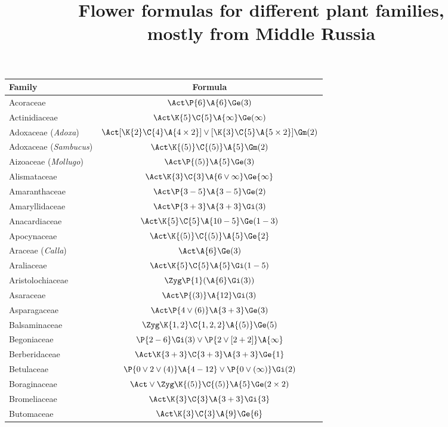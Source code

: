 ﻿\documentclass[12pt]{article}
\title{Flower formulas for different plant families,\\ mostly from Middle Russia}
\author{}
\date{}
\begin{document}
\maketitle

\begin{longtable}{lc}
\hline\rowcolor{tableheadcolor}\textbf{Family}&\textbf{Formula}\\[2pt]
\endhead
\hline
\endfoot
Acoraceae & $\Act\P{6}\A{6}\Ge(3)$\\[2pt]
Actinidiaceae & $\Act\K{5}\C{5}\A{\infty}\Ge(\infty)$\\[2pt]
Adoxaceae (\textit{Adoxa}) & $\Act[\K{2}\C{4}\A{4\times2}]\vee[\K{3}\C{5}\A{5\times2}]\Gm(2)$\\[2pt]
Adoxaceae (\textit{Sambucus}) & $\Act\K{(5)}\C{(5)}\A{5}\Gm(2)$\\[2pt]
Aizoaceae (\textit{Mollugo}) & $\Act\P{(5)}\A{5}\Ge(3)$\\[2pt]
Alismataceae & $\Act\K{3}\C{3}\A{6\vee\infty}\Ge{\infty}$\\[2pt]
Amaranthaceae & $\Act\P{3-5}\A{3-5}\Ge(2)$\\[2pt]
Amaryllidaceae & $\Act\P{3+3}\A{3+3}\Gi(3)$\\[2pt]
Anacardiaceae & $\Act\K{5}\C{5}\A{10-5}\Ge(1-3)$\\[2pt]
Apocynaceae & $\Act\K{(5)}\C{(5)}\A{5}\Ge{2}$\\[2pt]
Araceae (\textit{Calla}) & $\Act\A{6}\Ge(3)$\\[2pt]
Araliaceae & $\Act\K{5}\C{5}\A{5}\Gi(1-5)$\\[2pt]
Aristolochiaceae & $\Zyg\P{1}(\A{6}\Gi(3))$\\[2pt]
Asaraceae & $\Act\P{(3)}\A{12}\Gi(3)$\\[2pt]
Asparagaceae & $\Act\P{4\vee(6)}\A{3+3}\Ge(3)$\\[2pt]
Balsaminaceae  & $\Zyg\K{1,2}\C{1,2,2}\A{(5)}\Ge(5)$\\[2pt]
Begoniaceae & $\P{2-6}\Gi(3)\vee\P{2\vee[2+2]}\A{\infty}$\\[2pt]
Berberidaceae  & $\Act\K{3+3}\C{3+3}\A{3+3}\Ge{1}$\\[2pt]
Betulaceae & $\P{0\vee2\vee(4)}\A{4-12}\vee\P{0\vee(\infty)}\Gi(2)$\\[2pt]
Boraginaceae & $\Act\vee\Zyg\K{(5)}\C{(5)}\A{5}\Ge(2\times2)$\\[2pt]
Bromeliaceae &  $\Act\K{3}\C{3}\A{3+3}\Gi{3}$\\[2pt]
Butomaceae & $\Act\K{3}\C{3}\A{9}\Ge{6}$\\[2pt]

\end{longtable}
\end{document}
